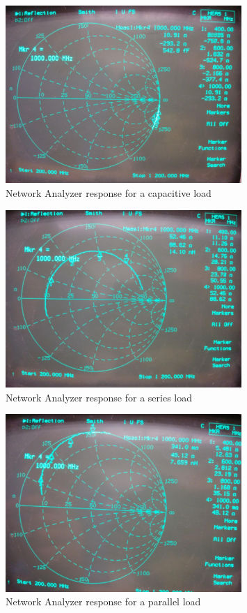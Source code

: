 \documentclass{article}
\begin{document}
\begin{figure}[H]
    \centering
    \includegraphics[width=0.8\textwidth]{./Images/253capacitive.jpg}
    \caption{Network Analyzer response for a capacitive load}
\end{figure}
\begin{figure}[H]
    \centering
    \includegraphics[width=0.8\textwidth]{./Images/253series.jpg}
    \caption{Network Analyzer response for a series load}
\end{figure}
\begin{figure}[H]
    \centering
    \includegraphics[width=0.8\textwidth]{./Images/253parallel.jpg}
    \caption{Network Analyzer response for a parallel load}
\end{figure}
\end{document}
